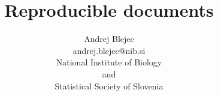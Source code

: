\usepackage[slovene]{babel}
\usepackage[utf8]{inputenc} %
%
%


%
\usepackage{pgf,pgfarrows,pgfnodes,pgfautomata,pgfheaps,pgfshade}
\usepackage{amsmath,amssymb}
\usepackage{colortbl}
\usepackage{Sweave}

\newcommand{\BV}{}
\newcommand{\EV}{}
\newcommand{\myemph}[1]{{\color{Sgreen} \textit{#1}}}
\usepackage[overlay,absolute]{textpos}





\newcommand{\mysection}[1]{
\setbeamercolor{background canvas}{bg=myBg}
\begin{frame}
\frametitle{}
\begin{center}
\textcolor{white}{\Huge{#1}}
\end{center}
\end{frame}
\setbeamercolor{background canvas}{bg=}
}
%
\newcommand{\slidefile}{slides-eda-2.pdf}
\newcommand{\ipdf}[2][0.7]{
    \setbeamercolor{background canvas}{bg=}
    \setkeys{Gin}{width=#1\textwidth}
    \vspace{2cm}%

    
    \setkeys{Gin}{width=0.7\textwidth}
}
%
\title{Reproducible documents}
\author[A. Blejec]{\large{Andrej Blejec}\\[12pt]
\small{andrej.blejec@nib.si}\\[12pt]
  {\small{
National Institute of Biology}
\\[2pt]
\tiny{and} \\[2pt]
\small{
Statistical Society of Slovenia}\\[12pt]
%
}
}



